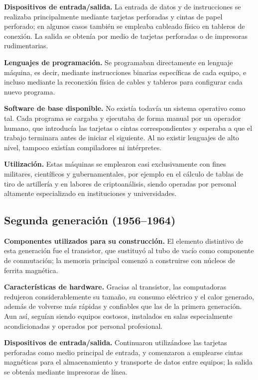 \documentclass[12pt,letterpaper]{article}
\begin{document}
\textbf{Dispositivos de entrada/salida.} La entrada de datos y de instrucciones se realizaba principalmente mediante tarjetas perforadas y cintas de papel perforado; en algunos casos también se empleaba cableado físico en tableros de conexión. La salida se obtenía por medio de tarjetas perforadas o de impresoras rudimentarias.

\textbf{Lenguajes de programación.} Se programaban directamente en lenguaje máquina, es decir, mediante instrucciones binarias específicas de cada equipo, e incluso mediante la reconexión física de cables y tableros para configurar cada nuevo programa.

\textbf{Software de base disponible.} No existía todavía un sistema operativo como tal. Cada programa se cargaba y ejecutaba de forma manual por un operador humano, que introducía las tarjetas o cintas correspondientes y esperaba a que el trabajo terminara antes de iniciar el siguiente. Al no existir lenguajes de alto nivel, tampoco existían compiladores ni intérpretes.

\textbf{Utilización.} Estas máquinas se emplearon casi exclusivamente con fines militares, científicos y gubernamentales, por ejemplo en el cálculo de tablas de tiro de artillería y en labores de criptoanálisis, siendo operadas por personal altamente especializado en instituciones y universidades.

\subsection{Segunda generación (1956--1964)}

\textbf{Componentes utilizados para su construcción.} El elemento distintivo de esta generación fue el transistor, que sustituyó al tubo de vacío como componente de conmutación; la memoria principal comenzó a construirse con núcleos de ferrita magnética.

\textbf{Características de hardware.} Gracias al transistor, las computadoras redujeron considerablemente su tamaño, su consumo eléctrico y el calor generado, además de volverse más rápidas y confiables que las de la primera generación. Aun así, seguían siendo equipos costosos, instalados en salas especialmente acondicionadas y operados por personal profesional.

\textbf{Dispositivos de entrada/salida.} Continuaron utilizándose las tarjetas perforadas como medio principal de entrada, y comenzaron a emplearse cintas magnéticas para el almacenamiento y transporte de datos entre equipos; la salida se obtenía mediante impresoras de línea.
\end{document}
